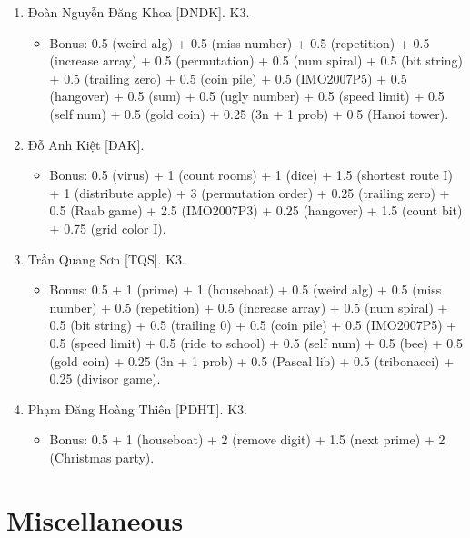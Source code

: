 \documentclass{article}
\begin{document}
\begin{enumerate}
    \item {\sc Đoàn Nguyễn Đăng Khoa [DNDK].} K3.
    \begin{itemize}
        \item Bonus: 0.5 (weird alg) + 0.5 (miss number) + 0.5 (repetition) + 0.5 (increase array) + 0.5 (permutation) + 0.5 (num spiral) + 0.5 (bit string) + 0.5 (trailing zero) + 0.5 (coin pile) + 0.5 (IMO2007P5) + 0.5 (hangover) + 0.5 (sum) + 0.5 (ugly number) + 0.5 (speed limit) + 0.5 (self num) + 0.5 (gold coin) + 0.25 (3n + 1 prob) + 0.5 (Hanoi tower).
    \end{itemize}
	\item {\sc Đỗ Anh Kiệt [DAK].}
	\begin{itemize}
		\item Bonus: 0.5 (virus) + 1 (count rooms) + 1 (dice) + 1.5 (shortest route I)  + 1 (distribute apple) + 3 (permutation order) + 0.25 (trailing zero) + 0.5 (Raab game) + 2.5 (IMO2007P3) + 0.25 (hangover) + 1.5 (count bit) + 0.75 (grid color I).
	\end{itemize}
	\item {\sc Trần Quang Sơn [TQS].} K3.
	\begin{itemize}
		\item Bonus: 0.5 + 1 (prime) + 1 (houseboat) + 0.5 (weird alg) + 0.5 (miss number) + 0.5 (repetition) + 0.5 (increase array) + 0.5 (num spiral) + 0.5 (bit string) + 0.5 (trailing 0) + 0.5 (coin pile) + 0.5 (IMO2007P5) + 0.5 (speed limit) + 0.5 (ride to school) + 0.5 (self num) + 0.5 (bee) + 0.5 (gold coin) + 0.25 (3n + 1 prob) + 0.5 (Pascal lib) + 0.5 (tribonacci) + 0.25 (divisor game).
	\end{itemize}
	\item {\sc Phạm Đăng Hoàng Thiên [PDHT].} K3.
		\begin{itemize}
		\item Bonus: 0.5 + 1 (houseboat) + 2 (remove digit) + 1.5 (next prime) + 2 (Christmas party).
	\end{itemize}
\end{enumerate}


\section{Miscellaneous}


\printbibliography[heading=bibintoc]
\end{document}
